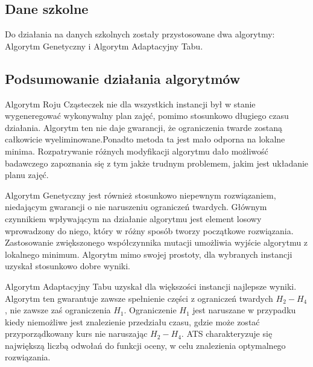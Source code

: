 \subsection{Dane szkolne}
Do działania na danych szkolnych zostały przystosowane dwa algorytmy: Algorytm Genetyczny i Algorytm Adaptacyjny Tabu.

\subsection{Podsumowanie działania algorytmów}
\par Algorytm Roju Cząsteczek nie dla wszystkich instancji był w stanie wygeneregować wykonywalny plan zajęć, pomimo stosunkowo długiego czasu działania. Algorytm ten nie daje gwarancji, że ograniczenia twarde zostaną całkowicie wyeliminowane.Ponadto metoda ta jest mało odporna na lokalne minima. Rozpatrywanie różnych modyfikacji algorytmu dało możliwość badawczego zapoznania się z tym jakże trudnym problemem, jakim jest układanie planu zajęć.
\par Algorytm Genetyczny jest również stosunkowo niepewnym rozwiązaniem, niedającym gwarancji o nie naruszeniu ograniczeń twardych. Głównym czynnikiem wpływającym na działanie algorytmu jest element losowy wprowadzony do niego, który w różny sposób tworzy początkowe rozwiązania. Zastosowanie zwiększonego współczynnika mutacji umożliwia wyjście algorytmu z lokalnego minimum. Algorytm mimo swojej prostoty, dla wybranych instancji uzyskał stosunkowo dobre wyniki.
\par Algorytm Adaptacyjny Tabu uzyskał dla większości instancji najlepsze wyniki. Algorytm ten gwarantuje zawsze spełnienie części z ograniczeń twardych $H_{2}-H_{4}$, nie zawsze zaś ograniczenia $H_{1}$. Ograniczenie ${H_{1}}$ jest naruszane w przypadku kiedy niemożliwe jest znalezienie przedziału czasu, gdzie może zostać przyporządkowany kurs nie naruszając $H_{2}-H_{4}$. ATS charakteryzuje się największą liczbą odwołań do funkcji oceny, w celu znalezienia optymalnego rozwiązania.







